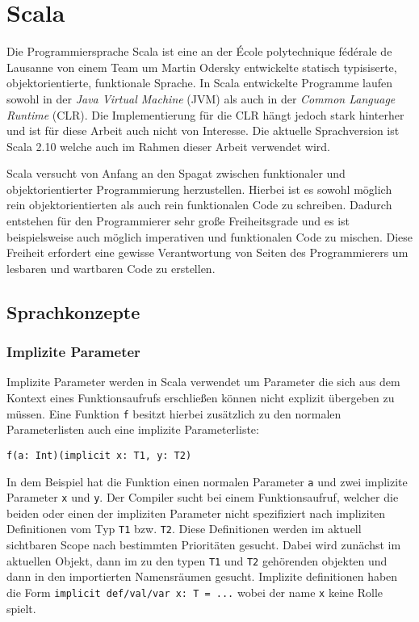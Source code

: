 \section{Scala}

Die Programmiersprache Scala ist eine an der École polytechnique fédérale de 
Lausanne von einem Team um Martin Odersky entwickelte statisch typisiserte, 
objektorientierte, funktionale Sprache\cite{scala}. In Scala entwickelte Programme laufen 
sowohl in der \textit{Java Virtual Machine} (JVM) als auch in der \textit{Common 
Language Runtime} (CLR). Die Implementierung für die CLR hängt jedoch stark 
hinterher und ist für diese Arbeit auch nicht von Interesse. Die aktuelle 
Sprachversion ist Scala 2.10 welche auch im Rahmen dieser Arbeit verwendet wird.

Scala versucht von Anfang an den Spagat zwischen funktionaler und 
objektorientierter Programmierung herzustellen. Hierbei ist es sowohl möglich 
rein objektorientierten als auch rein funktionalen Code zu schreiben. Dadurch 
entstehen für den Programmierer sehr große Freiheitsgrade und es ist 
beispielsweise auch möglich imperativen und funktionalen Code zu mischen. Diese 
Freiheit erfordert eine gewisse Verantwortung von Seiten des Programmierers um 
lesbaren und wartbaren Code zu erstellen.

\subsection{Sprachkonzepte}

\subsubsection{Implizite Parameter}

Implizite Parameter werden in Scala verwendet um Parameter die sich aus dem 
Kontext eines Funktionsaufrufs erschließen können nicht explizit übergeben zu 
müssen. Eine Funktion \texttt{f} besitzt hierbei zusätzlich zu den normalen 
Parameterlisten auch eine implizite Parameterliste:

\begin{lstlisting}
f(a: Int)(implicit x: T1, y: T2)
\end{lstlisting}

In dem Beispiel hat die Funktion einen normalen Parameter \texttt{a} und zwei 
implizite Parameter \texttt{x} und \texttt{y}. Der Compiler sucht bei einem 
Funktionsaufruf, welcher die beiden oder einen der impliziten Parameter nicht 
spezifiziert nach impliziten Definitionen vom Typ \texttt{T1} bzw. \texttt{T2}. 
Diese Definitionen werden im aktuell sichtbaren Scope nach bestimmten 
Prioritäten gesucht. Dabei wird zunächst im aktuellen Objekt, dann im zu den 
typen \texttt{T1} und \texttt{T2} gehörenden objekten und dann in den 
importierten Namensräumen gesucht. Implizite definitionen haben die Form 
\texttt{implicit def/val/var x: T = ...} wobei der name \texttt{x} keine Rolle 
spielt.

